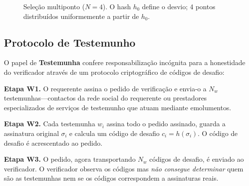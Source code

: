 \documentclass[11pt,a4paper,twocolumn]{article}
\begin{document}
\begin{figure}[ht]
\centering
{}
\caption{Seleção multiponto ($N{=}4$). O hash $h_0$ define o desvio; 4 pontos distribuídos uniformemente a partir de $h_0$.}
\label{fig:multipoint}
\end{figure}

\subsection{Protocolo de Testemunho}

O papel de \textbf{Testemunha} confere responsabilização incógnita para a honestidade do verificador através de um protocolo criptográfico de códigos de desafio:

\textbf{Etapa W1.} O requerente assina o pedido de verificação e envia-o a $N_w$ testemunhas---contactos da rede social do requerente ou prestadores especializados de serviços de testemunho que atuam mediante emolumentos.

\textbf{Etapa W2.} Cada testemunha $w_i$ assina todo o pedido assinado, guarda a assinatura original $\sigma_i$ e calcula um código de desafio $c_i = h(\sigma_i)$. O código de desafio é acrescentado ao pedido.

\textbf{Etapa W3.} O pedido, agora transportando $N_w$ códigos de desafio, é enviado ao verificador. O verificador observa os códigos mas \emph{não consegue determinar} quem são as testemunhas nem se os códigos correspondem a assinaturas reais.
\end{document}
